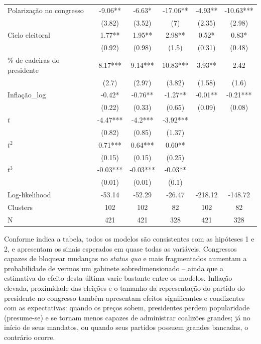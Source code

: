 \begin{table}[htb]
{\begin{tabular}{lccccc}
Polarização no congresso & -9.06** & -6.63* & -17.06** & -4.93** & -10.63*** \\
{} & (3.82) & (3.52) & (7) & (2.35) & (2.98) \\
Ciclo eleitoral & 1.77** & 1.95** & 2.98** & 0.52* &  0.83*\\
{} & (0.92) & (0.98) & (1.5) & (0.31) & (0.48) \\
\% de cadeiras do presidente & 8.17*** & 9.14*** & 10.83*** & 3.93** & 2.42 \\
{} & (2.7) & (2.97) & (3.82) & (1.58) & (1.6) \\
Inflação_{log} & -0.42* & -0.76** & -1.27** & -0.01** & -0.21*** \\
{} & (0.22) & (0.33) & (0.65) & (0.09) & (0.08) \\
$t$ & -4.47*** & -4.2*** & -3.92*** & & \\
{} & (0.82) & (0.85) & (1.37) & & \\
$t^{2}$ & 0.71*** & 0.64*** & 0.60** & & \\
{} & (0.15) & (0.15) & (0.25)& & \\
$t^{3}$ & -0.03*** & -0.03*** & -0.03** & & \\
{} & (0.01) & (0.01) & (0.1) & & \\
Log-likelihood & -53.14 & -52.29 & -26.47 & -218.12 & -148.72 \\
Clusters & 102 & 102 & 82 & 102 & 82 \\
N & 421 & 421 & 328 & 421 & 328 \\
\bottomrule
\end{tabular}%
}{ %
}
\end{table}

Conforme indica a tabela, todos os modelos são consistentes com as hipóteses 1 e 2, e apresentam os sinais esperados em quase todas as variáveis. Congressos capazes de bloquear mudanças no \textit{status quo} e mais fragmentados aumentam a probabilidade de vermos um gabinete sobredimensionado -- ainda que a estimativa do efeito desta  última varie bastante entre os modelos. Inflação elevada, proximidade das eleições e o tamanho da representação do partido do presidente no congresso também apresentam efeitos significantes e condizentes com as expectativas: quando os preços sobem, presidentes perdem popularidade (presume-se) e se tornam menos capazes de administrar coalizões grandes; já no início de seus mandatos, ou quando seus partidos possuem grandes bancadas, o contrário ocorre.

